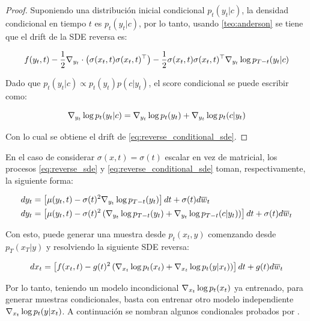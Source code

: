 \begin{proof}
    Suponiendo una distribución inicial condicional $p_t(y_t|c)$, la densidad condicional en tiempo $t$ es $p_t(y_t|c)$, por lo tanto, usando \ref{teo:anderson} se tiene que el drift de la SDE reversa es:

    \begin{equation}
        f(y_t,t) - \frac{1}{2}\nabla_{y_t}\cdot\left(\sigma(x_t,t)\sigma(x_t,t)^\top\right) - \frac{1}{2}\sigma(x_t,t)\sigma(x_t,t)^\top \nabla_{y_t} \log p_{T-t}(y_t|c)
    \end{equation}

    Dado que $p_t(y_t|c)\propto p_t(y_t)p(c|y_t)$, el score condicional se puede escribir como:

    \begin{equation}
        \nabla_{y_t} \log p_t(y_t|c) = \nabla_{y_t} \log p_t(y_t) + \nabla_{y_t} \log p_t(c|y_t)
    \end{equation}

    Con lo cual se obtiene el drift de \eqref{eq:reverse_conditional_sde}.
\end{proof}

En el caso de considerar $\sigma(x,t)=\sigma(t)$ escalar en vez de matricial, los procesos \eqref{eq:reverse_sde} y \eqref{eq:reverse_conditional_sde} toman, respectivamente, la siguiente forma:

\begin{align}
    dy_t & = \left[\mu(y_t,t)-\sigma(t)^2\nabla_{y_t} \log p_{T-t}(y_t)\right]dt + \sigma(t)d\overline{w}_t                                        \\
    dy_t & = \left[\mu(y_t,t)-\sigma(t)^2\left(\nabla_{y_t} \log p_{T-t}(y_t) + \nabla_{y_t} \log p_{T-t}(c|y_t)\right)\right]dt + \sigma(t)d\overline{w}_t
\end{align}

Con esto, puede generar una muestra desde $p_t(x_t,y)$ comenzando desde $p_T(x_T|y)$ y resolviendo la siguiente SDE reversa:

\begin{equation}
    dx_t = \left[f(x_t,t)-g(t)^2\left(\nabla_{x_t} \log p_t(x_t) + \nabla_{x_t} \log p_t(y|x_t)\right)\right]dt + g(t)d\overline{w}_t
\end{equation}

Por lo tanto, teniendo un modelo incondicional $\nabla_{x_t} \log p_t(x_t)$ ya entrenado, para generar muestras condicionales, basta con entrenar otro modelo independiente $\nabla_{x_t} \log p_t(y|x_t)$. A continuación se nombran algunos condionales probados por \cite{song2021scorebased}.

